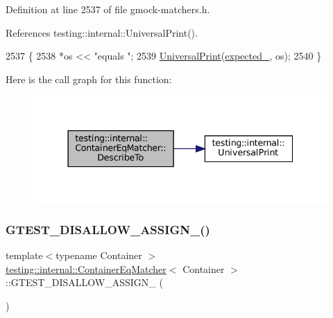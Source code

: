 Definition at line 2537 of file gmock-\/matchers.\+h.



References testing\+::internal\+::\+Universal\+Print().


\begin{DoxyCode}
2537                                         \{
2538     *os << \textcolor{stringliteral}{"equals "};
2539     \hyperlink{namespacetesting_1_1internal_a30708fa2bacf11895b03bdb21eb72309}{UniversalPrint}(\hyperlink{classtesting_1_1internal_1_1ContainerEqMatcher_ab5d9ad6869dc59908a4b1c72fde78d31}{expected\_}, os);
2540   \}
\end{DoxyCode}
Here is the call graph for this function\+:
\nopagebreak
\begin{figure}[H]
\begin{center}
\leavevmode
\includegraphics[width=337pt]{classtesting_1_1internal_1_1ContainerEqMatcher_a28ace6da475d05134916eb50e54baf1e_cgraph}
\end{center}
\end{figure}
\mbox{\label{classtesting_1_1internal_1_1ContainerEqMatcher_a5d18bc67e3e53b3c3cfa416100262014}} 
\subsubsection{\texorpdfstring{G\+T\+E\+S\+T\+\_\+\+D\+I\+S\+A\+L\+L\+O\+W\+\_\+\+A\+S\+S\+I\+G\+N\+\_\+()}{GTEST\_DISALLOW\_ASSIGN\_()}}
{\footnotesize\ttfamily template$<$typename Container $>$ \\
\hyperlink{classtesting_1_1internal_1_1ContainerEqMatcher}{testing\+::internal\+::\+Container\+Eq\+Matcher}$<$ Container $>$\+::G\+T\+E\+S\+T\+\_\+\+D\+I\+S\+A\+L\+L\+O\+W\+\_\+\+A\+S\+S\+I\+G\+N\+\_\+ (\begin{DoxyParamCaption}\item[{\hyperlink{classtesting_1_1internal_1_1ContainerEqMatcher}{Container\+Eq\+Matcher}$<$ Container $>$}]{ }\end{DoxyParamCaption})\hspace{0.3cm}{\ttfamily [private]}}


